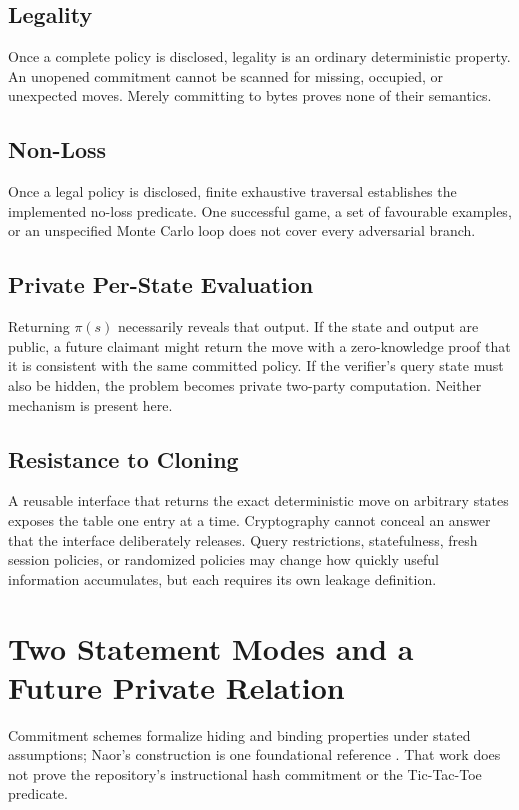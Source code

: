 \subsection{Legality}

Once a complete policy is disclosed, legality is an ordinary deterministic
property. An unopened commitment cannot be scanned for missing, occupied, or
unexpected moves. Merely committing to bytes proves none of their semantics.

\subsection{Non-Loss}

Once a legal policy is disclosed, finite exhaustive traversal establishes the
implemented no-loss predicate. One successful game, a set of favourable
examples, or an unspecified Monte Carlo loop does not cover every adversarial
branch.

\subsection{Private Per-State Evaluation}

Returning $\pi(s)$ necessarily reveals that output. If the state and output
are public, a future claimant might return the move with a zero-knowledge proof
that it is consistent with the same committed policy. If the verifier's query
state must also be hidden, the problem becomes private two-party computation.
Neither mechanism is present here.

\subsection{Resistance to Cloning}

A reusable interface that returns the exact deterministic move on arbitrary
states exposes the table one entry at a time. Cryptography cannot conceal an
answer that the interface deliberately releases. Query restrictions,
statefulness, fresh session policies, or randomized policies may change how
quickly useful information accumulates, but each requires its own leakage
definition.

\section{Two Statement Modes and a Future Private Relation}
\label{sec:ttt-future-relation}

Commitment schemes formalize hiding and binding properties under stated
assumptions; Naor's construction is one foundational reference
\cite{naor1991bitcommitment}. That work does not prove the repository's
instructional hash commitment or the Tic-Tac-Toe predicate.

